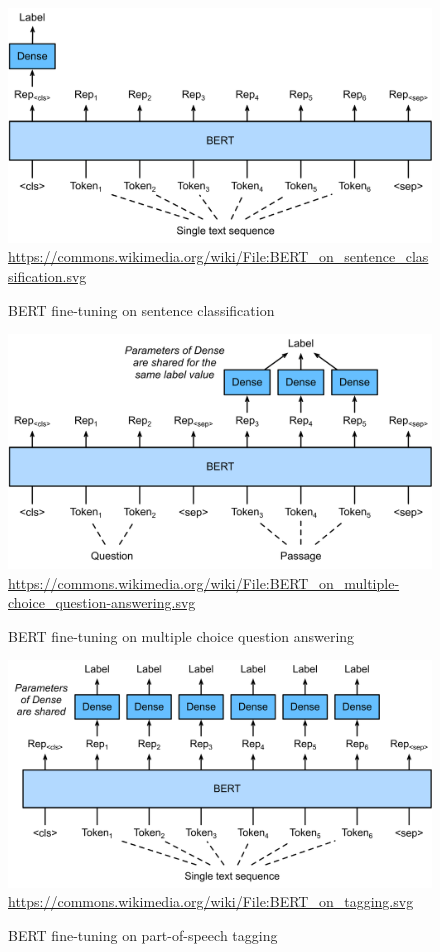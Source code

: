 \begin{figure}
\centering
\includegraphics[width=.8\textwidth]{BERT_on_sentence_classification.svg.png} \\

\tiny \url{https://commons.wikimedia.org/wiki/File:BERT_on_sentence_classification.svg}\normalsize
\caption{BERT fine-tuning on sentence classification}
\label{fig:bert_sentence_classification}
\end{figure}

\begin{figure}
\centering
\includegraphics[width=.8\textwidth]{BERT_on_multiple-choice_question-answering.svg.png} \\

\tiny \url{https://commons.wikimedia.org/wiki/File:BERT_on_multiple-choice_question-answering.svg} \normalsize
\caption{BERT fine-tuning on multiple choice question answering}
\label{fig:bert_multiple_choice}
\end{figure}

\begin{figure}
\centering
\includegraphics[width=.8\textwidth]{BERT_on_tagging.svg.png} \\

\tiny \url{https://commons.wikimedia.org/wiki/File:BERT_on_tagging.svg} \normalsize
\caption{BERT fine-tuning on part-of-speech tagging}
\label{fig:bert_tagging}
\end{figure}

